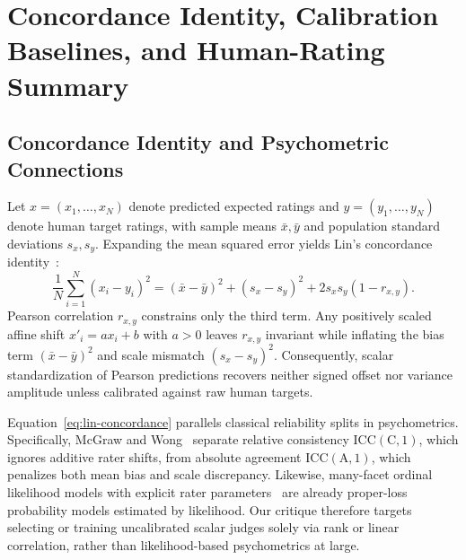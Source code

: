 
\section{Concordance Identity, Calibration Baselines, and Human-Rating Summary}
\label{app:concordance}

\subsection{Concordance Identity and Psychometric Connections}
Let $x = (x_1, \dots, x_N)$ denote predicted expected ratings and $y = (y_1, \dots, y_N)$ denote human target ratings, with sample means $\bar{x}, \bar{y}$ and population standard deviations $s_x, s_y$.
Expanding the mean squared error yields Lin's concordance identity~\citep{lin1989concordance}:
\begin{equation}
\label{eq:lin-concordance}
\frac{1}{N} \sum_{i=1}^{N} (x_i - y_i)^2 = (\bar{x} - \bar{y})^2 + (s_x - s_y)^2 + 2 s_x s_y (1 - r_{x,y}).
\end{equation}
Pearson correlation $r_{x,y}$ constrains only the third term.
Any positively scaled affine shift $x'_i = a x_i + b$ with $a > 0$ leaves $r_{x,y}$ invariant while inflating the bias term $(\bar{x} - \bar{y})^2$ and scale mismatch $(s_x - s_y)^2$.
Consequently, scalar standardization of Pearson predictions recovers neither signed offset nor variance amplitude unless calibrated against raw human targets.

Equation~\eqref{eq:lin-concordance} parallels classical reliability splits in psychometrics.
Specifically, McGraw and Wong~\citep{mcgraw1996forming} separate relative consistency $\mathrm{ICC}(\mathrm{C},1)$, which ignores additive rater shifts, from absolute agreement $\mathrm{ICC}(\mathrm{A},1)$, which penalizes both mean bias and scale discrepancy.
Likewise, many-facet ordinal likelihood models with explicit rater parameters~\citep{linacre1989many} are already proper-loss probability models estimated by likelihood.
Our critique therefore targets selecting or training uncalibrated scalar judges solely via rank or linear correlation, rather than likelihood-based psychometrics at large.

